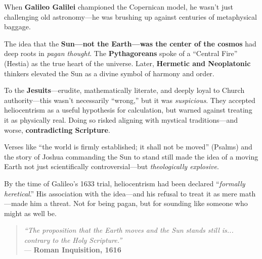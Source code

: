 \begin{tcolorbox}[title=Galileo and the Pagan Sun: When Heresy Orbited Scripture, colback=gray!5, colframe=black, fonttitle=\bfseries]

  When \textbf{Galileo Galilei} championed the Copernican model, he wasn’t just challenging old astronomy—he was brushing up against centuries of metaphysical baggage.
  
  The idea that the \textbf{Sun—not the Earth—was the center of the cosmos} had deep roots in \textit{pagan thought}. The \textbf{Pythagoreans} spoke of a “Central Fire” (Hestia) as the true heart of the universe. Later, \textbf{Hermetic and Neoplatonic} thinkers elevated the Sun as a divine symbol of harmony and order.
  
  To the \textbf{Jesuits}—erudite, mathematically literate, and deeply loyal to Church authority—this wasn’t necessarily “wrong,” but it was \textit{suspicious}. They accepted heliocentrism as a useful hypothesis for calculation, but warned against treating it as physically real. Doing so risked aligning with mystical traditions—and worse, \textbf{contradicting Scripture}.
  
  Verses like “the world is firmly established; it shall not be moved” (Psalms) and the story of Joshua commanding the Sun to stand still made the idea of a moving Earth not just scientifically controversial—but \textit{theologically explosive}.
  
  By the time of Galileo’s 1633 trial, heliocentrism had been declared “\textit{formally heretical}.” His association with the idea—and his refusal to treat it as mere math—made him a threat. Not for being pagan, but for sounding like someone who might as well be.
  
  \begin{quote}
  \textit{“The proposition that the Earth moves and the Sun stands still is... contrary to the Holy Scripture.”} \\
  — \textbf{Roman Inquisition, 1616}
  \end{quote}
  
\end{tcolorbox}


